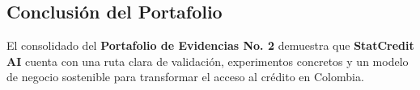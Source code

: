 \documentclass[11pt,a4paper]{article}
\begin{document}
\subsection{Conclusión del Portafolio}
El consolidado del \textbf{Portafolio de Evidencias No. 2} demuestra que \textbf{StatCredit AI} cuenta con una ruta clara de validación, experimentos concretos y un modelo de negocio sostenible para transformar el acceso al crédito en Colombia.
\end{document}
